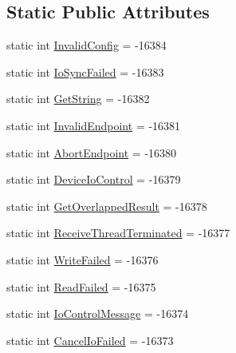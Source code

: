 \subsection*{Static Public Attributes}
\begin{DoxyCompactItemize}
\item 
static int \hyperlink{classcom_1_1clover_1_1remotepay_1_1sdk_1_1_clover_device_error_event_a5c60fe506f210aa5c1cee437e04d6057}{Invalid\+Config} = -\/16384
\item 
static int \hyperlink{classcom_1_1clover_1_1remotepay_1_1sdk_1_1_clover_device_error_event_a04c3015b73bc2b4198b7d3ca8a859e6c}{Io\+Sync\+Failed} = -\/16383
\item 
static int \hyperlink{classcom_1_1clover_1_1remotepay_1_1sdk_1_1_clover_device_error_event_aee8e2e30302a2fdd4fa90569ae0ddbc4}{Get\+String} = -\/16382
\item 
static int \hyperlink{classcom_1_1clover_1_1remotepay_1_1sdk_1_1_clover_device_error_event_a8fbf5ab107b35af49e031cdd81ef73a1}{Invalid\+Endpoint} = -\/16381
\item 
static int \hyperlink{classcom_1_1clover_1_1remotepay_1_1sdk_1_1_clover_device_error_event_a52c872fba7d0f2833d2c797cf48f6b1e}{Abort\+Endpoint} = -\/16380
\item 
static int \hyperlink{classcom_1_1clover_1_1remotepay_1_1sdk_1_1_clover_device_error_event_a2f5a0433e8b34837cbd039c651a0b017}{Device\+Io\+Control} = -\/16379
\item 
static int \hyperlink{classcom_1_1clover_1_1remotepay_1_1sdk_1_1_clover_device_error_event_a6b190613d1aaaa1f1c03dcb6057c0a95}{Get\+Overlapped\+Result} = -\/16378
\item 
static int \hyperlink{classcom_1_1clover_1_1remotepay_1_1sdk_1_1_clover_device_error_event_aee6348645e7ed52c2516a17f0ce28ed2}{Receive\+Thread\+Terminated} = -\/16377
\item 
static int \hyperlink{classcom_1_1clover_1_1remotepay_1_1sdk_1_1_clover_device_error_event_a787e91b36785bfd929cdbeb019d53a2a}{Write\+Failed} = -\/16376
\item 
static int \hyperlink{classcom_1_1clover_1_1remotepay_1_1sdk_1_1_clover_device_error_event_a884792cd59bd1c7ff9f6f3cac40cf952}{Read\+Failed} = -\/16375
\item 
static int \hyperlink{classcom_1_1clover_1_1remotepay_1_1sdk_1_1_clover_device_error_event_abd1ceda9d3c97ca92dc5494fc9ddf9ec}{Io\+Control\+Message} = -\/16374
\item 
static int \hyperlink{classcom_1_1clover_1_1remotepay_1_1sdk_1_1_clover_device_error_event_ab917a5afa1eec6d7c2643083a5e3a72a}{Cancel\+Io\+Failed} = -\/16373

\end{DoxyCompactItemize}
